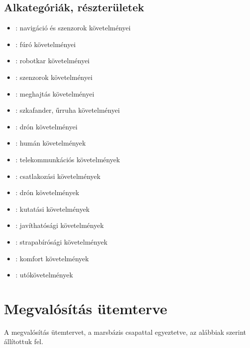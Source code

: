 \documentclass[12pt]{report}
\begin{document}
\subsection{Alkategóriák, részterületek}
\begin{itemize}
  \item {}: navigáció és szenzorok követelményei 
  \item {}: fúró követelményei
  \item {}: robotkar követelményei
  \item {}: szenzorok követelményei
  \item {}: meghajtás követelményei
  \item {}: szkafander, űrruha követelményei
  \item {}: drón követelményei
  \item {}: humán követelmények
  \item {}: telekommunkációs követelmények
  \item {}: csatlakozási követelmények
  \item {}: drón követelmények
  \item {}: kutatási követelmények
  \item {}: javíthatósági követelmények
  \item {}: strapabírósági követelmények
  \item {}: komfort követelmények
	  
  \item {}: utókövetelmények
\end{itemize}




\section{Megvalósítás ütemterve}

A megvalósítás ütemtervet, a marsbázis csapattal egyeztetve, az alábbiak szerint állítottuk fel.
\end{document}
